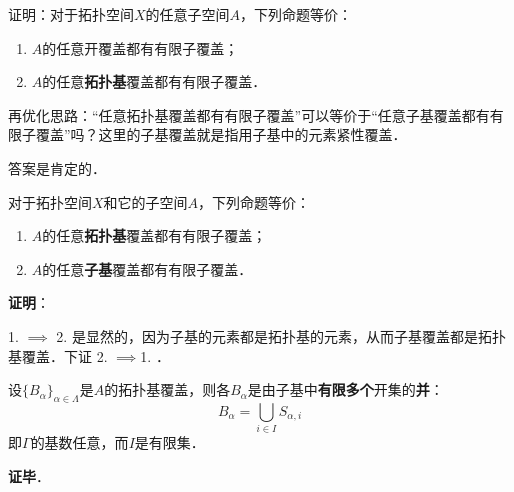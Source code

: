 \begin{exercise}{}
证明：对于拓扑空间$X$的任意子空间$A$，下列命题等价：
\begin{enumerate}
\item $A$的任意开覆盖都有有限子覆盖；
\item $A$的任意\textbf{拓扑基}覆盖都有有限子覆盖．
\end{enumerate}
\end{exercise}

再优化思路：“任意拓扑基覆盖都有有限子覆盖”可以等价于“任意子基覆盖都有有限子覆盖”吗？这里的子基覆盖就是指用子基中的元素紧性覆盖．

答案是肯定的．

\begin{theorem}{}
对于拓扑空间$X$和它的子空间$A$，下列命题等价：
\begin{enumerate}
\item $A$的任意\textbf{拓扑基}覆盖都有有限子覆盖；
\item $A$的任意\textbf{子基}覆盖都有有限子覆盖．
\end{enumerate}
\end{theorem}

\textbf{证明}：

1. $\implies$ 2. 是显然的，因为子基的元素都是拓扑基的元素，从而子基覆盖都是拓扑基覆盖．下证 2. $\implies$1. ．

设$\{B_\alpha\}_{\alpha\in\Lambda}$是$A$的拓扑基覆盖，则各$B_\alpha$是由子基中\textbf{有限多个}开集的\textbf{并}：
\begin{equation}
B_\alpha = \bigcup_{i\in I}S_{\alpha, i}
\end{equation}
即$\Gamma$的基数任意，而$I$是有限集．



\textbf{证毕}．























